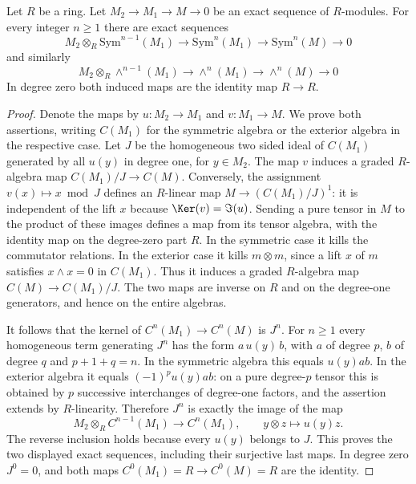 \begin{lemma}
\label{lemma-presentation-sym-exterior}
Let $R$ be a ring.
Let $M_2 \to M_1 \to M \to 0$ be an exact sequence of $R$-modules.
For every integer $n \geq 1$ there are exact sequences
$$
M_2 \otimes_R \text{Sym}^{n - 1}(M_1)
\to
\text{Sym}^n(M_1)
\to
\text{Sym}^n(M)
\to
0
$$
and similarly
$$
M_2 \otimes_R \wedge^{n - 1}(M_1)
\to
\wedge^n(M_1)
\to
\wedge^n(M)
\to
0
$$
In degree zero both induced maps are the identity map $R \to R$.
\end{lemma}

\begin{proof}
Denote the maps by $u : M_2 \to M_1$ and $v : M_1 \to M$.
We prove both assertions, writing $C(M_1)$ for the symmetric algebra
or the exterior algebra in the respective case. Let $J$ be the
homogeneous two sided ideal of $C(M_1)$ generated by all
$u(y)$ in degree one, for $y \in M_2$.
The map $v$ induces a graded $R$-algebra map
$C(M_1)/J \to C(M)$. Conversely, the assignment
$v(x) \mapsto x \bmod J$ defines an $R$-linear map
$M \to (C(M_1)/J)^1$: it is independent of the lift $x$
because $\Ker(v) = \Im(u)$. Sending a pure tensor in $M$
to the product of these images defines a map from its tensor algebra,
with the identity map on the degree-zero part $R$.
In the symmetric case it kills the commutator relations.
In the exterior case it kills $m\otimes m$, since a lift $x$ of $m$
satisfies $x\wedge x = 0$ in $C(M_1)$.
Thus it induces a graded $R$-algebra map
$C(M) \to C(M_1)/J$. The two maps are inverse on $R$ and on
the degree-one generators, and hence on the entire algebras.

\medskip\noindent
It follows that the kernel of $C^n(M_1) \to C^n(M)$ is $J^n$.
For $n \geq 1$ every homogeneous term generating $J^n$ has the form
$a\,u(y)\,b$, with $a$ of degree $p$, $b$ of degree $q$ and
$p+1+q=n$. In the symmetric algebra this equals $u(y)ab$.
In the exterior algebra it equals $(-1)^p u(y)ab$:
on a pure degree-$p$ tensor this is obtained by $p$ successive
interchanges of degree-one factors, and the assertion extends by
$R$-linearity. Therefore $J^n$ is exactly the image of the map
$$
M_2\otimes_R C^{n-1}(M_1) \longrightarrow C^n(M_1),
\qquad y\otimes z \longmapsto u(y)z.
$$
The reverse inclusion holds because every $u(y)$ belongs to $J$.
This proves the two displayed exact sequences, including their
surjective last maps. In degree zero $J^0=0$, and both maps
$C^0(M_1)=R \to C^0(M)=R$ are the identity.
\end{proof}